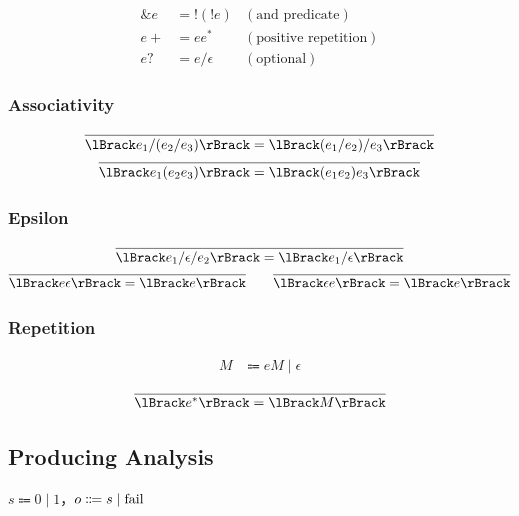 \begin{align*}
  \mathop{\&} e &= \mathop{!} (\mathop{!} e) &(\text{and predicate}) \\
  e+ &= e e^* &(\text{positive repetition}) \\
  e? &= e / \epsilon &(\text{optional})
\end{align*}

\subsubsection{Associativity}

\begin{gather*}
  \infer{\semanticf{e_1 / (e_2 / e_3)} = \semanticf{(e_1 / e_2) / e_3}}{}
  \\
  \infer{\semanticf{e_1 (e_2 e_3)} = \semanticf{(e_1 e_2) e_3}}{}
\end{gather*}

\subsubsection{Epsilon}

\begin{gather*}
  \infer{\semanticf{e_1 / \epsilon / e_2} = \semanticf{e_1 / \epsilon}}{}
  \\
  \infer{\semanticf{e \epsilon} = \semanticf{e}}{}
  \hspace{2em}
  \infer{\semanticf{\epsilon e} = \semanticf{e}}{}
\end{gather*}

\subsubsection{Repetition}

\begin{align*}
  M &\Coloneqq e M \mid \epsilon
\end{align*}

\begin{gather*}
  \infer{\semanticf{e^*} = \semanticf{M}}{}
\end{gather*}

\subsection{Producing Analysis}

$s \Coloneqq 0 \mid 1$，$o \Coloneqq s \mid \mathop{\mathrm{fail}}$

